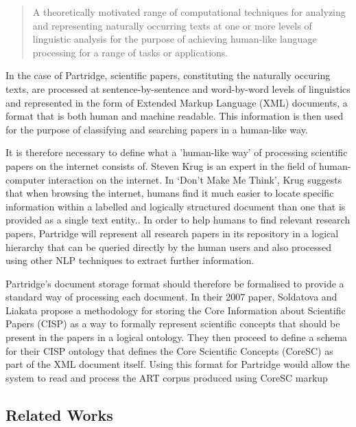 \documentclass[12pt,a4paper]{article}
\begin{document}
\begin{quotation} 
A theoretically motivated range of computational techniques for analyzing and
representing naturally occurring texts at one or more levels of linguistic
analysis for the purpose of achieving human-like language processing for a
range of tasks or applications. \cite{liddy2001natural} 
\end{quotation}

In the case of Partridge, scientific papers, constituting the naturally occuring
texts, are processed at sentence-by-sentence and word-by-word levels of
linguistics and represented in the form of Extended Markup Language (XML)
documents, a format that is both human and machine readable. This information
is then used for the purpose of classifying and searching papers in a
human-like way. 

It is therefore necessary to define what a 'human-like way' of processing
scientific papers on the internet consists of. Steven Krug is an expert in the field of
human-computer interaction on the internet. In `Don't Make Me Think', Krug
suggests that when browsing the internet, humans find it much easier to locate
specific information within a labelled and logically structured document than
one that is provided as a single text entity.\cite{Krug:2005:DMM:1051204}. In
order to help humans to find relevant research papers, Partridge will represent
all research papers in its repository in a logical hierarchy that can be
queried directly by the human users and also processed using other NLP
techniques to extract further information. 

Partridge's document storage format should therefore be formalised to provide a
standard way of processing each document. In their 2007 paper, Soldatova and
Liakata propose a methodology for storing the Core Information about Scientific
Papers (CISP) as a way to formally represent scientific concepts that should be
present in the papers in a logical ontology\cite{soldatova2007ontology}. They
then proceed to define a schema for their CISP ontology that defines the
Core Scientific Concepts (CoreSC) as part of the XML document
itself\cite{liakata2008guidelines}. Using this format for Partridge would allow
the system to read and process the ART corpus produced using CoreSC markup

\subsection{Related Works}
\label{sec:prior_art}
\end{document}
